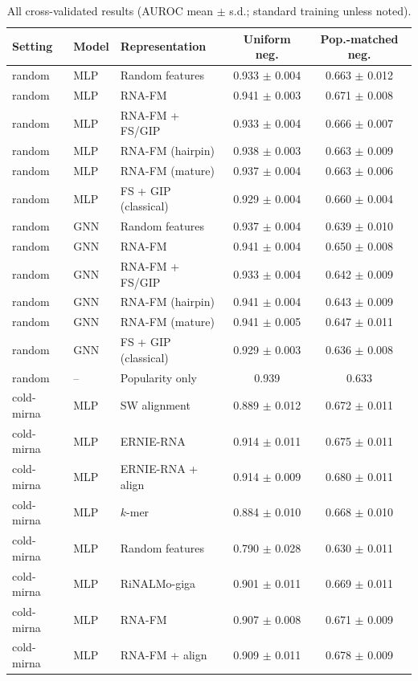 \begin{longtable}{lllcc}
\caption{All cross-validated results (AUROC mean $\pm$ s.d.; standard training unless noted).}\label{tab:s1}\\\toprule
Setting & Model & Representation & Uniform neg. & Pop.-matched neg.\\\midrule\endhead
random & MLP & Random features & 0.933 $\pm$ 0.004 & 0.663 $\pm$ 0.012\\
random & MLP & RNA-FM & 0.941 $\pm$ 0.003 & 0.671 $\pm$ 0.008\\
random & MLP & RNA-FM + FS/GIP & 0.933 $\pm$ 0.004 & 0.666 $\pm$ 0.007\\
random & MLP & RNA-FM (hairpin) & 0.938 $\pm$ 0.003 & 0.663 $\pm$ 0.009\\
random & MLP & RNA-FM (mature) & 0.937 $\pm$ 0.004 & 0.663 $\pm$ 0.006\\
random & MLP & FS + GIP (classical) & 0.929 $\pm$ 0.004 & 0.660 $\pm$ 0.004\\
random & GNN & Random features & 0.937 $\pm$ 0.004 & 0.639 $\pm$ 0.010\\
random & GNN & RNA-FM & 0.941 $\pm$ 0.004 & 0.650 $\pm$ 0.008\\
random & GNN & RNA-FM + FS/GIP & 0.933 $\pm$ 0.004 & 0.642 $\pm$ 0.009\\
random & GNN & RNA-FM (hairpin) & 0.941 $\pm$ 0.004 & 0.643 $\pm$ 0.009\\
random & GNN & RNA-FM (mature) & 0.941 $\pm$ 0.005 & 0.647 $\pm$ 0.011\\
random & GNN & FS + GIP (classical) & 0.929 $\pm$ 0.003 & 0.636 $\pm$ 0.008\\
random & -- & Popularity only & 0.939 & 0.633\\\midrule
cold-mirna & MLP & SW alignment & 0.889 $\pm$ 0.012 & 0.672 $\pm$ 0.011\\
cold-mirna & MLP & ERNIE-RNA & 0.914 $\pm$ 0.011 & 0.675 $\pm$ 0.011\\
cold-mirna & MLP & ERNIE-RNA + align & 0.914 $\pm$ 0.009 & 0.680 $\pm$ 0.011\\
cold-mirna & MLP & $k$-mer & 0.884 $\pm$ 0.010 & 0.668 $\pm$ 0.010\\
cold-mirna & MLP & Random features & 0.790 $\pm$ 0.028 & 0.630 $\pm$ 0.011\\
cold-mirna & MLP & RiNALMo-giga & 0.901 $\pm$ 0.011 & 0.669 $\pm$ 0.011\\
cold-mirna & MLP & RNA-FM & 0.907 $\pm$ 0.008 & 0.671 $\pm$ 0.009\\
cold-mirna & MLP & RNA-FM + align & 0.909 $\pm$ 0.011 & 0.678 $\pm$ 0.009\\

\end{longtable}
